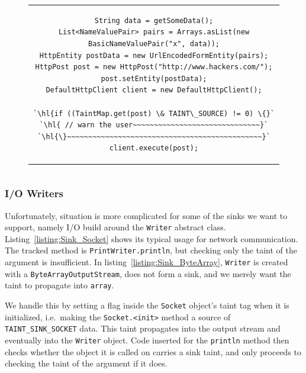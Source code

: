 \documentclass[12pt,twoside,notitlepage]{report}
\begin{document}
\begin{figure}[h]
	\centering
	\begin{tabular}{c}
	\begin{lstlisting}
String data = getSomeData();
List<NameValuePair> pairs = Arrays.asList(new BasicNameValuePair("x", data));
HttpEntity postData = new UrlEncodedFormEntity(pairs);
HttpPost post = new HttpPost("http://www.hackers.com/");
post.setEntity(postData);
DefaultHttpClient client = new DefaultHttpClient();

`\hl{if ((TaintMap.get(post) \& TAINT\_SOURCE) != 0) \{}`
`\hl{ // warn the user~~~~~~~~~~~~~~~~~~~~~~~~~~~~~~}`
`\hl{\}~~~~~~~~~~~~~~~~~~~~~~~~~~~~~~~~~~~~~~~~~~~~~~}`
client.execute(post);
	\end{lstlisting}
	\end{tabular}
	\begin{lstlisting}[caption={HTTP request using the Apache client, with sink instrumentation},
	                   label={listing:Sink_ApacheHTTPClient}]
	\end{lstlisting}
\end{figure}

\subsubsection{I/O Writers}

Unfortunately, situation is more complicated for some of the sinks we want to support, namely I/O build around the \verb$Writer$ abstract class. Listing~\ref{listing:Sink_Socket} shows its typical usage for network communication. The tracked method is \verb$PrintWriter.println$, but checking only the taint of the argument is insufficient. In listing~\ref{listing:Sink_ByteArray}, \verb$Writer$ is created with a \verb$ByteArrayOutputStream$, does not form a sink, and we merely want the taint to propagate into \verb$array$. 

We handle this by setting a flag inside the \verb$Socket$ object's taint tag when it is initialized, i.e.\ making the \verb$Socket.<init>$ method a source of \verb$TAINT_SINK_SOCKET$ data. This taint propagates into the output stream and eventually into the \verb$Writer$ object. Code inserted for the \verb$println$ method then checks whether the object it is called on carries a sink taint, and only proceeds to checking the taint of the argument if it does.
\end{document}

